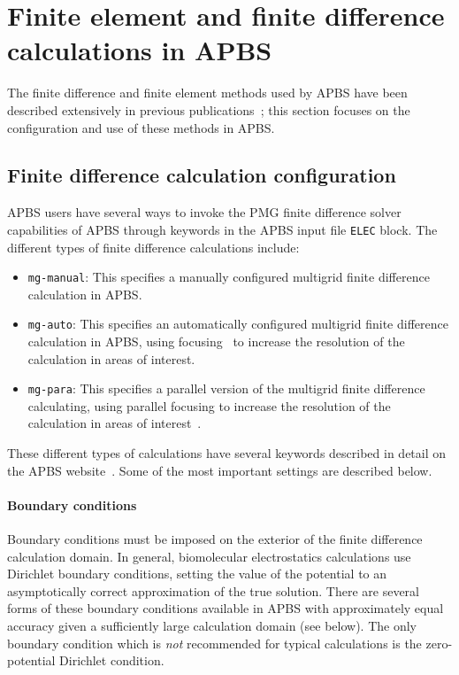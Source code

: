 \documentclass[12pt,titlepage]{article}
\newcommand{\keyword}[1]{\texttt{#1}}
\begin{document}
\section{Finite element and finite difference calculations in APBS} \label{app:fd}
The finite difference and finite element methods used by APBS have been described extensively in previous publications~\cite{Baker2000, Holst2000, Holst1993, Baker2001, Baker2001a}; this section focuses on the configuration and use of these methods in APBS.

\subsection{Finite difference calculation configuration}
APBS users have several ways to invoke the PMG finite difference solver~\cite{Holst1993} capabilities of APBS through keywords in the APBS input file \keyword{ELEC} block.
The different types of finite difference calculations include:
\begin{itemize}
	\item \keyword{mg-manual}: This specifies a manually configured multigrid finite difference calculation in APBS.
	\item \keyword{mg-auto}: This specifies an automatically configured multigrid finite difference calculation in APBS, using focusing~\cite{Gilson1988} to increase the resolution of the calculation in areas of interest.
	\item \keyword{mg-para}:  This specifies a parallel version of the multigrid finite difference calculating, using parallel focusing to increase the resolution of the calculation in areas of interest~\cite{Baker2001a}.
\end{itemize}
These different types of calculations have several keywords described in detail on the APBS website~\cite{APBSweb}.
Some of the most important settings are described below.

\paragraph{Boundary conditions}
Boundary conditions must be imposed on the exterior of the finite difference calculation domain.
In general, biomolecular electrostatics calculations use Dirichlet boundary conditions, setting the value of the potential to an asymptotically correct approximation of the true solution.
There are several forms of these boundary conditions available in APBS with approximately equal accuracy given a sufficiently large calculation domain (see below).
The only boundary condition which is \emph{not} recommended for typical calculations is the zero-potential Dirichlet condition.
\end{document}
